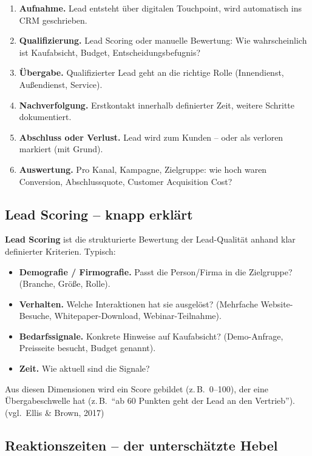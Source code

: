 \documentclass[11pt,a4paper,oneside]{article}
\newcommand{\fachbegriff}[1]{\textbf{#1}}
\newcommand{\quelle}[1]{{\footnotesize\color{lpGray}(#1)}}
\begin{document}
\begin{enumerate}
  \item \fachbegriff{Aufnahme.} Lead entsteht über digitalen Touchpoint, wird automatisch ins CRM geschrieben.
  \item \fachbegriff{Qualifizierung.} Lead Scoring oder manuelle Bewertung: Wie wahrscheinlich ist Kaufabsicht, Budget, Entscheidungsbefugnis?
  \item \fachbegriff{Übergabe.} Qualifizierter Lead geht an die richtige Rolle (Innendienst, Außendienst, Service).
  \item \fachbegriff{Nachverfolgung.} Erstkontakt innerhalb definierter Zeit, weitere Schritte dokumentiert.
  \item \fachbegriff{Abschluss oder Verlust.} Lead wird zum Kunden -- oder als verloren markiert (mit Grund).
  \item \fachbegriff{Auswertung.} Pro Kanal, Kampagne, Zielgruppe: wie hoch waren Conversion, Abschlussquote, Customer Acquisition Cost?
\end{enumerate}

\subsection{Lead Scoring -- knapp erklärt}

\fachbegriff{Lead Scoring} ist die strukturierte Bewertung der Lead-Qualität anhand klar definierter Kriterien. Typisch:

\begin{itemize}
  \item \textbf{Demografie / Firmografie.} Passt die Person/Firma in die Zielgruppe? (Branche, Größe, Rolle).
  \item \textbf{Verhalten.} Welche Interaktionen hat sie ausgelöst? (Mehrfache Website-Besuche, Whitepaper-Download, Webinar-Teilnahme).
  \item \textbf{Bedarfssignale.} Konkrete Hinweise auf Kaufabsicht? (Demo-Anfrage, Preisseite besucht, Budget genannt).
  \item \textbf{Zeit.} Wie aktuell sind die Signale?
\end{itemize}

Aus diesen Dimensionen wird ein Score gebildet (z.\,B.\ 0--100), der eine Übergabeschwelle hat (z.\,B.\ ``ab 60 Punkten geht der Lead an den Vertrieb''). \quelle{vgl.\ Ellis \& Brown, 2017}

\subsection{Reaktionszeiten -- der unterschätzte Hebel}
\end{document}
